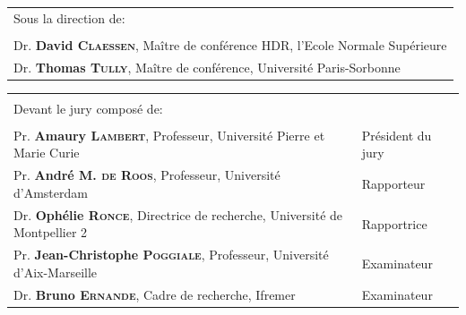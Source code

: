 \begin{titlingpage}
\begin{Spacing}{1}
\begin{flushleft}
\begin{tabularx}{1.03\textwidth}{X}
Sous la direction de: \\
\\
Dr. \textbf{David \textsc{Claessen}}, Maître de conférence HDR, l'Ecole Normale
Supérieure  \\
Dr. \textbf{Thomas \textsc{Tully}}, Maître de conférence, Université
Paris-Sorbonne  \\
\end{tabularx}
\begin{tabularx}{1.03\textwidth}{Xl}
&\\
Devant le jury composé de: & \\
& \\
Pr. \textbf{Amaury \textsc{Lambert}}, Professeur, Université Pierre
et Marie Curie & Président du jury \\
Pr. \textbf{André M. \textsc{de Roos}}, Professeur, Université d'Amsterdam &
Rapporteur \\
Dr. \textbf{Ophélie \textsc{Ronce}}, Directrice de recherche, Université de
Montpellier 2 & Rapportrice \\
Pr. \textbf{Jean-Christophe \textsc{Poggiale}}, Professeur, Université
d'Aix-Marseille & Examinateur\\
Dr. \textbf{Bruno \textsc{Ernande}}, Cadre de recherche, Ifremer &
Examinateur
\\
\end{tabularx}

\endgroup
\end{flushleft}
\end{Spacing}
 

\end{titlingpage}